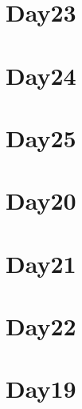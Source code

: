 
\section*{Day23}

\vfill
\section*{Day24}

\vfill
\section*{Day25}

\vfill
\section*{Day20}

\vfill
\section*{Day21}

\vfill
\section*{Day22}

\vfill
\section*{Day19}

\vfill

